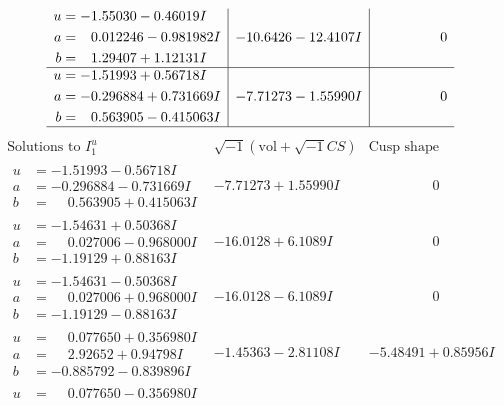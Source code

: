 \documentclass[1p]{elsarticle_modified}
\theoremstyle{definition}
\newcommand{\I}{\sqrt{-1}}
\begin{document}
$$\begin{array}{c|c|c}
\begin{aligned}
u &= -1.55030 - 0.46019 I \\
a &= \phantom{-}0.012246 - 0.981982 I \\
b &= \phantom{-}1.29407 + 1.12131 I\end{aligned}
 & -10.6426 - 12.4107 I & \phantom{-0.000000 } 0 \\ \hline\begin{aligned}
u &= -1.51993 + 0.56718 I \\
a &= -0.296884 + 0.731669 I \\
b &= \phantom{-}0.563905 - 0.415063 I\end{aligned}
 & -7.71273 - 1.55990 I & \phantom{-0.000000 } 0\\
 \hline 
 \end{array}$$\newpage$$\begin{array}{c|c|c}  
\text{Solutions to }I^u_{1}& \I (\text{vol} + \sqrt{-1}CS) & \text{Cusp shape}\\
 \hline 
\begin{aligned}
u &= -1.51993 - 0.56718 I \\
a &= -0.296884 - 0.731669 I \\
b &= \phantom{-}0.563905 + 0.415063 I\end{aligned}
 & -7.71273 + 1.55990 I & \phantom{-0.000000 } 0 \\ \hline\begin{aligned}
u &= -1.54631 + 0.50368 I \\
a &= \phantom{-}0.027006 - 0.968000 I \\
b &= -1.19129 + 0.88163 I\end{aligned}
 & -16.0128 + 6.1089 I & \phantom{-0.000000 } 0 \\ \hline\begin{aligned}
u &= -1.54631 - 0.50368 I \\
a &= \phantom{-}0.027006 + 0.968000 I \\
b &= -1.19129 - 0.88163 I\end{aligned}
 & -16.0128 - 6.1089 I & \phantom{-0.000000 } 0 \\ \hline\begin{aligned}
u &= \phantom{-}0.077650 + 0.356980 I \\
a &= \phantom{-}2.92652 + 0.94798 I \\
b &= -0.885792 - 0.839896 I\end{aligned}
 & -1.45363 - 2.81108 I & -5.48491 + 0.85956 I \\ \hline\begin{aligned}
u &= \phantom{-}0.077650 - 0.356980 I \\

\end{aligned}
\end{array}$$
\end{document}
